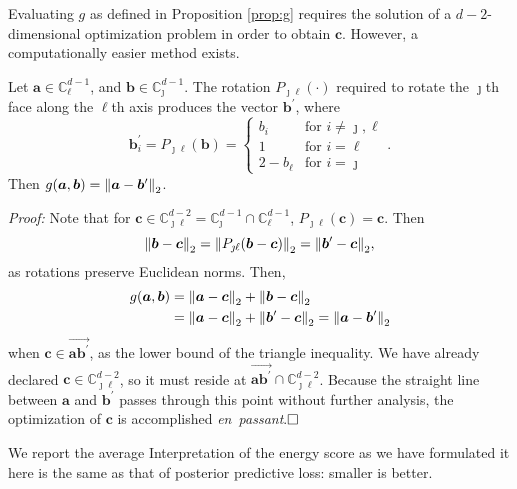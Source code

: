 Evaluating $g$ as defined in Proposition \ref{prop:g} requires the solution of a $d-2$-dimensional 
  optimization problem in order to obtain $\bm{c}$.  However, a computationally easier  method exists.
\begin{prop}
    Let $\bm{a} \in {\mathbb C}_{\ell}^{d-1}$, and $\bm{b} \in {\mathbb C}_{\jmath}^{d-1}$.  The 
  rotation $P_{\jmath\ell}(\cdot)$ required to rotate the $\jmath$th face along the $\ell$th axis 
  produces the vector $\bm{b}^\prime$, where
  \begin{equation}
    \label{eqn:rotation}
     \bm{b}^{\prime}_i = P_{\jmath\ell}(\bm{b}) = 
    \begin{cases}
        b_{i} &\text{for }i\neq \jmath,\ell\\
        1 &\text{for }i = \ell\\
        2 - b_{\ell} &\text{for }i = \jmath
    \end{cases}.
  \end{equation}
  Then $g(\bm{a},\bm{b}) = \pnorm{\bm{a} - \bm{b}^{\prime}}{2}$.
\end{prop}
{\em Proof:}
Note that for 
  $\bm{c} \in {\mathbb C}_{\jmath\ell}^{d-2} = {\mathbb C}_{\jmath}^{d-1}\cap{\mathbb C}_{\ell}^{d-1}$,
  $P_{\jmath\ell}(\bm{c}) = \bm{c}$.  Then
  \begin{equation*}
     \pnorm{\bm{b} - \bm{c}}{2} = \pnorm{P_{\jmath\ell}(\bm{b} - \bm{c})}{2} = \pnorm{\bm{b}^{\prime} - \bm{c}}{2},
  \end{equation*}
  as rotations preserve Euclidean norms.  Then,
  \begin{equation*}
    \begin{aligned}
    g(\bm{a}, \bm{b}) &= \pnorm{\bm{a} - \bm{c}}{2} + \pnorm{\bm{b} - \bm{c}}{2}\\
    &= \pnorm{\bm{a} - \bm{c}}{2} + \pnorm{\bm{b}^{\prime} - \bm{c}}{2} = \pnorm{\bm{a} - \bm{b}^{\prime}}{2}
    \end{aligned}
  \end{equation*}
  when $\bm{c} \in \overrightarrow{\bm{a}\bm{b}^{\prime}}$, as the lower bound of the triangle inequality.  We have already declared $\bm{c}\in{\mathbb C}_{\jmath\ell}^{d-2}$, so it must reside at $\overrightarrow{\bm{a}\bm{b}^{\prime}}\cap{\mathbb C}_{\jmath\ell}^{d-2}$.  Because the straight line between $\bm{a}$ and $\bm{b}^{\prime}$ passes through this point without further analysis, the optimization of $\bm{c}$ is accomplished \emph{en~passant}.$\hfill\Box$

We report the average Interpretation of the energy score as we have formulated it here is the same as that of posterior predictive loss: smaller is better.

